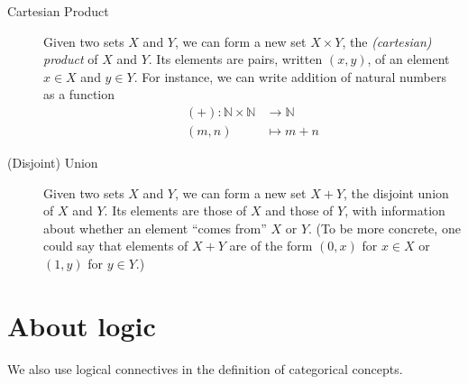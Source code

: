 \documentclass[a4paper,11pt, oneside,titlepage=false]{scrbook}
\theoremstyle{plain}
\theoremstyle{definition}
\newcommand{\NN}{\ensuremath{\mathbb{N}}}
\begin{document}
\begin{description}
\item [Cartesian Product] Given two sets $X$ and $Y$, we can form a new set $X\times Y$, the \emph{(cartesian) product} of $X$ and $Y$. Its elements are pairs, written $(x,y)$, of an element $x \in X$ and $y \in Y$.
  For instance, we can write addition of natural numbers as a function
  \begin{align*}
    (+) : \NN\times \NN &\to \NN
    \\
    (m,n) & \mapsto m + n
  \end{align*}
\item[(Disjoint) Union] Given two sets $X$ and $Y$, we can form a new set $X + Y$, the disjoint union of $X$ and $Y$. Its elements are those of $X$ and those of $Y$, with information about whether an element ``comes from'' $X$ or $Y$. (To be more concrete, one could say that elements of $X+Y$ are of the form $(0,x)$ for $x\in X$ or $(1,y)$ for $y\in Y$.)
\end{description}

\section{About logic}

We also use logical connectives in the definition of categorical concepts.
\end{document}
